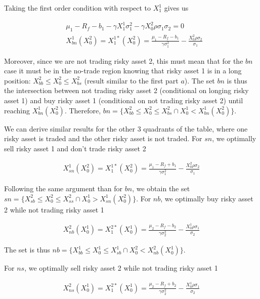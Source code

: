 \documentclass[10pt]{article}
\begin{document}
Taking the first order condition with respect to $X_1^1$ gives us

\begin{align*}
	& \mu_1 - R_f - b_1 - \gamma X_1^1\sigma_1^2 - \gamma X_0^2 \rho \sigma_1 \sigma_2 = 0	\\
	& X_{bn}^1(X_0^2) =  X_1^{1*}(X_0^2)  = \frac{\mu_1 - R_f - b_1}{\gamma \sigma_1^2} - \frac{X_0^2 \rho  \sigma_2}{\sigma_1}
\end{align*}

Moreover, since we are not trading risky asset 2, this must mean that for the  $bn$ case it must be in the no-trade region knowing that risky asset 1 is in a long position: $X_{bb}^2 \leq X_0^2 \leq X_{bs}^2$ (result similar to the first part $a$). The  set $bn $ is thus the intersection between not trading risky asset 2 (conditional on longing risky asset 1) and buy risky asset 1 (conditional on not trading risky asset 2) until reaching $X_{bn}^1(X_0^2)$. Therefore, $bn = \{ X_{bb}^2 \leq X_0^2 \leq X_{bs}^2 \cap X_0^1 < X_{bn}^1(X_0^2) \}$.

\bigbreak

We can derive similar results for the other 3 quadrants of the table, where one risky asset is traded and the other risky asset is not traded. For $sn$, we optimally sell risky asset 1 and don't trade risky asset 2

\begin{align*}
	X_{sn}^1(X_0^2) =  X_1^{1*}(X_0^2)  = \frac{\mu_1 - R_f + b_1}{\gamma \sigma_1^2} - \frac{X_0^2 \rho  \sigma_2}{\sigma_1}
\end{align*}

Following the same argument than for $bn$, we obtain the set $sn = \{ X_{sb}^2 \leq X_0^2 \leq X_{ss}^2 \cap X_0^1 > X_{sn}^1(X_0^2) \}$. For $nb$, we optimally buy risky asset 2 while not trading risky asset 1

\begin{align*}
	X_{nb}^2(X_0^1) =  X_1^{2*}(X_0^1)  = \frac{\mu_2 - R_f - b_2}{\gamma \sigma_2^2} - \frac{X_0^1 \rho  \sigma_1}{\sigma_2}
\end{align*}

The set is thus $nb = \{ X_{bb}^1 \leq X_0^1 \leq X_{sb}^1 \cap X_0^2 < X_{nb}^2(X_0^1) \}$.

For $ns$, we optimally sell risky asset 2 while not trading risky asset 1

\begin{align*}
	X_{ns}^2(X_0^1) =  X_1^{2*}(X_0^1)  = \frac{\mu_2 - R_f + b_2}{\gamma \sigma_2^2} - \frac{X_0^1 \rho  \sigma_1}{\sigma_2}
\end{align*}
\end{document}

